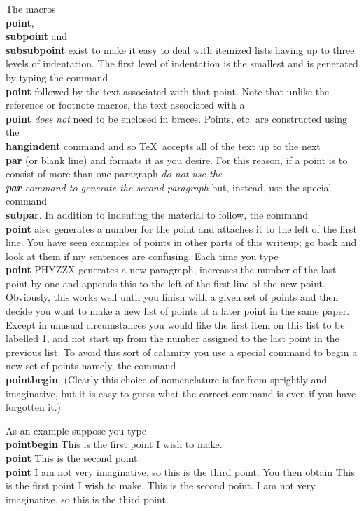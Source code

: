 The macros {\bf \\point},{\bf \\subpoint} and {\bf \\subsubpoint}
exist to make it easy to deal with itemized
lists having up to three levels
of indentation.
The first level of indentation is the smallest and is generated by
typing the command {\bf \\point} followed by the text associated with that
point.
Note that unlike the reference or footnote macros,
the text associated with
a {\bf \\point} {\it does not} need to be enclosed in braces.
Points, etc. are constructed using the {\bf \\hangindent} command
and so \TeX\ accepts all of the text up to the next {\bf \\par} (or blank
line) and formats it as you desire.
For this reason, if a point is to consist of more than one paragraph
{\it do not use the {\bf \\par} command to generate the second paragraph}
but, instead, use the special command {\bf \\subpar}.
In addition to indenting the material to follow, the command
{\bf \\point} also generates a number for the point and attaches it
to the left of the first line.
You have seen examples of points in other parts of this writeup; go back
and look at them if my sentences are confusing.
Each time you type {\bf \\point}
PHYZZX generates a new paragraph, increases
the number of the last point by one and appends this to the left of the
first line of the new point.
Obviously, this works well until you finish with a given set of points
and then decide you want to make a new list of points at a later point
in the same paper.
Except in unusual circumstances you would like the first item on this
list to be labelled 1, and not start up from the number assigned to
the last point in the previous list.
To avoid this sort of calamity you use a special command to begin
a new set of points namely, the command {\bf \\pointbegin}.
(Clearly this choice of nomenclature is far
from sprightly and imaginative,
but it is easy to guess what the correct command is even if you
have forgotten it.)
 
As an example suppose you type \nextline
{\bf \\pointbegin} \nextline
This is the first point I wish to make.  \nextline
{\bf \\point} \nextline
This is the second point. \nextline
{\bf \\point} \nextline
I am not very imaginative, so this is the third point. \nextline
You then obtain
\pointbegin
This is the first point I wish to make.
\point
This is the second point.
\point
I am not very imaginative, so this is the third point.
 
